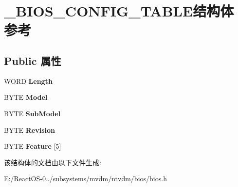 \hypertarget{struct___b_i_o_s___c_o_n_f_i_g___t_a_b_l_e}{}\section{\+\_\+\+B\+I\+O\+S\+\_\+\+C\+O\+N\+F\+I\+G\+\_\+\+T\+A\+B\+L\+E结构体 参考}
\label{struct___b_i_o_s___c_o_n_f_i_g___t_a_b_l_e}
\subsection*{Public 属性}
\begin{DoxyCompactItemize}
\item 
\mbox{\label{struct___b_i_o_s___c_o_n_f_i_g___t_a_b_l_e_a6d16505d06580516273b11b7ed2f836e}} 
W\+O\+RD {\bfseries Length}
\item 
\mbox{\label{struct___b_i_o_s___c_o_n_f_i_g___t_a_b_l_e_afdfb4a4cf80139c39bf604536dfc4c6d}} 
B\+Y\+TE {\bfseries Model}
\item 
\mbox{\label{struct___b_i_o_s___c_o_n_f_i_g___t_a_b_l_e_ac36780775c22548fb3a49aecf7da6bf5}} 
B\+Y\+TE {\bfseries Sub\+Model}
\item 
\mbox{\label{struct___b_i_o_s___c_o_n_f_i_g___t_a_b_l_e_ac4ef80b298df0dce8a58c245e85d7067}} 
B\+Y\+TE {\bfseries Revision}
\item 
\mbox{\label{struct___b_i_o_s___c_o_n_f_i_g___t_a_b_l_e_a11f558e18e37fd903700e36040625de1}} 
B\+Y\+TE {\bfseries Feature} \mbox{[}5\mbox{]}
\end{DoxyCompactItemize}


该结构体的文档由以下文件生成\+:\begin{DoxyCompactItemize}
\item 
E\+:/\+React\+O\+S-\/0../subsystems/mvdm/ntvdm/bios/bios.\+h\end{DoxyCompactItemize}
